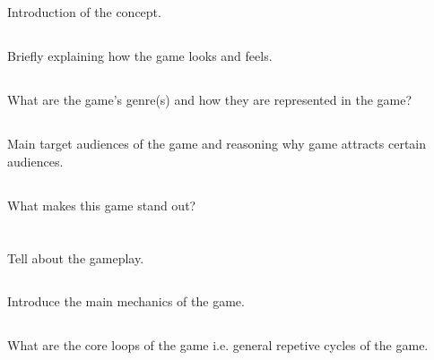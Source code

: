 \documentclass{article}
\begin{document}
\subsection*{\IIIc}
\subsection*{\IIId}
\clearpage

\section*{\I}
\subsection*{\Ia}
Introduction of the concept.
\subsection*{\Ib}
Briefly explaining how the game looks and feels.
\subsection*{\Ic}
What are the game's genre(s) and how they are represented in the game?
\subsection*{\Id}
Main target audiences of the game and reasoning why game attracts certain audiences.
\subsection*{\Ie}
What makes this game stand out?
\section*{\II}
\subsection*{\IIa}
Tell about the gameplay.
\subsection*{\IIb}
Introduce the main mechanics of the game.
\subsection*{\IIc}
What are the core loops of the game i.e. general repetive cycles of the game.
\end{document}
